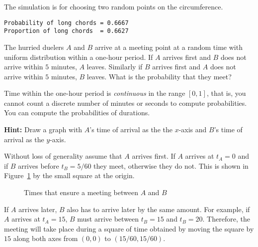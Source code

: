 \newpage

\sml{}

The simulation is for choosing two random points on the circumference.
\begin{verbatim}
Probability of long chords = 0.6667
Proportion of long chords  = 0.6627
\end{verbatim}


\begin{prob}{The hurried duelers}
$A$ and $B$ arrive at a meeting point at a random time with uniform distribution within a one-hour period. If $A$ arrives first and $B$ does not arrive within $5$ minutes, $A$ leaves. Similarly if $B$ arrives first and $A$ does not arrive within $5$ minutes, $B$ leaves. What is the probability that they meet?

Time within the one-hour period is \emph{continuous} in the range $[0,1]$, that is, you cannot count a discrete number of minutes or seconds to compute probabilities. You can compute the probabilities of durations.

\textbf{Hint:} Draw a graph with $A$'s time of arrival as the the $x$-axis and $B$'s time of arrival as the $y$-axis.
\end{prob}

\solution{}

Without loss of generality assume that $A$ arrives first. If $A$ arrives at $t_A=0$ and if $B$ arrives before $t_B=5/60$ they meet, otherwise they do not. This is shown in Figure~\ref{f.duel} by the small square at the origin.
\begin{figure}[tb]
\begin{center}
\end{center}
\caption{Times that ensure a meeting between $A$ and $B$}\label{f.duel}
\end{figure}
If $A$ arrives later, $B$ also has to arrive later by the same amount. For example, if $A$ arrives at $t_A=15$, $B$ must arrive between $t_B=15$ and $t_B=20$. Therefore, the meeting will take place during a square of time obtained by moving the square by $15$ along both axes from $(0,0)$ to $(15/60,15/60)$.

